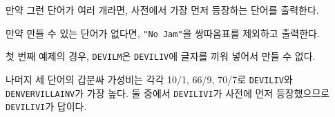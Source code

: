 \begin{problem}{\kcpcdeviltitle}
    만약 그런 단어가 여러 개라면, 사전에서 가장 먼저 등장하는 단어를 출력한다.
    
    만약 만들 수 있는 단어가 없다면, \verb|"No Jam"|을 쌍따옴표를 제외하고 출력한다.

    \Examples
    
    \begin{example}
    \end{example}
    
    \Explanation
    첫 번째 예제의 경우, \verb|DEVILM|은 \verb|DEVILIV|에 글자를 끼워 넣어서 만들 수 없다.
    
    나머지 세 단어의 갑분싸 가성비는 각각 10/1, 66/9, 70/7로 \verb|DEVILIV|와 \verb|DENVERVILLAINV|가 가장 높다. 둘 중에서 \verb|DEVILIVI|가 사전에 먼저 등장했으므로 \verb|DEVILIVI|가 답이다.
    
    
\end{problem}

